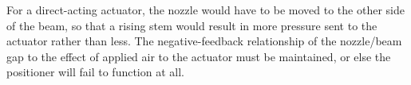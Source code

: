 \vskip 10pt

For a direct-acting actuator, the nozzle would have to be moved to the other side of the beam, so that a rising stem would result in more pressure sent to the actuator rather than less.  The negative-feedback relationship of the nozzle/beam gap to the effect of applied air to the actuator must be maintained, or else the positioner will fail to function at all.





